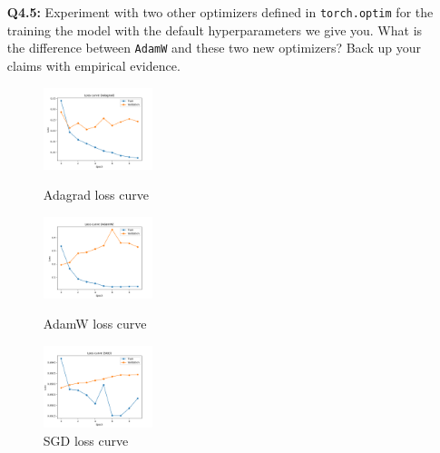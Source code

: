 \documentclass{article}
\begin{document}
\begin{itemize}
\begin{itemize}
    \item[\textbf{Q4.5:}] Experiment with two other optimizers defined in \texttt{torch.optim} for the training the model with the default hyperparameters we give you. What is the difference between \texttt{AdamW} and these two new optimizers? Back up your claims with empirical evidence.
    
    \begin{figure}[!htbp]
      \centering
      \begin{subcaptiongroup}
        \centering
        \parbox[b]{.3\textwidth}{%
        \centering
        \includegraphics[width=0.3\textwidth]{loss_curve_epoch_10_Adagrad.png}
        \caption{Adagrad loss curve}\label{Adagrad-loss}}%
        \parbox[b]{.3\textwidth}{%
        \centering
        \includegraphics[width=0.3\textwidth]{loss_curve_epoch_10_AdamW.png}
        \caption{AdamW loss curve}\label{AdamW-loss}}%
        \centering
        \parbox[b]{.3\textwidth}{
        \centering
        \includegraphics[width=0.3\textwidth]{loss_curve_epoch_10_SGD.png}
        \caption{SGD loss curve}\label{SGD-loss}}
      \end{subcaptiongroup}
    \end{figure}


\end{itemize}
\end{itemize}
\end{document}
